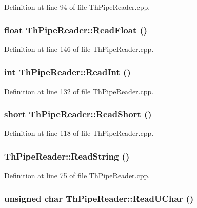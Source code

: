 Definition at line 94 of file ThPipeReader.cpp.\hypertarget{class_th_pipe_reader_0133c2b00c5ce367620c111c35fce496}{
\subsubsection[{ReadFloat}]{\setlength{\rightskip}{0pt plus 5cm}float ThPipeReader::ReadFloat ()}}
\label{class_th_pipe_reader_0133c2b00c5ce367620c111c35fce496}




Definition at line 146 of file ThPipeReader.cpp.\hypertarget{class_th_pipe_reader_9ac28a28529feee55e127fbf3b5dbde3}{
\subsubsection[{ReadInt}]{\setlength{\rightskip}{0pt plus 5cm}int ThPipeReader::ReadInt ()}}
\label{class_th_pipe_reader_9ac28a28529feee55e127fbf3b5dbde3}




Definition at line 132 of file ThPipeReader.cpp.\hypertarget{class_th_pipe_reader_ad9c0b0d4f1e4a79509863d1a8f824fd}{
\subsubsection[{ReadShort}]{\setlength{\rightskip}{0pt plus 5cm}short ThPipeReader::ReadShort ()}}
\label{class_th_pipe_reader_ad9c0b0d4f1e4a79509863d1a8f824fd}




Definition at line 118 of file ThPipeReader.cpp.\hypertarget{class_th_pipe_reader_1613d62288c1ca43e69b28ec6b1426dd}{
\subsubsection[{ReadString}]{ ThPipeReader::ReadString ()}}
\label{class_th_pipe_reader_1613d62288c1ca43e69b28ec6b1426dd}




Definition at line 75 of file ThPipeReader.cpp.\hypertarget{class_th_pipe_reader_d8bad1a098466c6ce11053b38ff31df5}{
\subsubsection[{ReadUChar}]{\setlength{\rightskip}{0pt plus 5cm}unsigned char ThPipeReader::ReadUChar ()}}
\label{class_th_pipe_reader_d8bad1a098466c6ce11053b38ff31df5}




